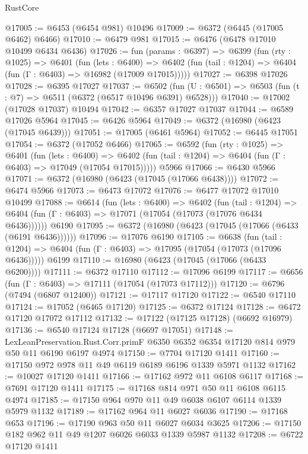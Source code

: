 \begin{lexlean}{RustCore}
\begin{coremodule}
@17005 := @6453 (@6454 @981) @10496
@17009 := @6372 (@6445 (@17005 @6462) @6466)
@17010 := @6479 @981
@17015 := @6476 (@6478 @17010 @10499 @6434 @6436)
@17026 := fun (params : @6397) =>
  @6399
    (fun (rty : @1025) =>
    @6401
      (fun (lets : @6400) =>
      @6402 (fun (tail : @1204) => @6404 (fun (Γ : @6403) => @16982 (@17009 @17015)))))
@17027 := @6398 @17026
@17028 := @6395 @17027
@17037 := @6502
    (fun (U : @6501) => @6503 (fun (t : @7) => @6511 (@6372 (@6517 @10496 @6391) @6528)))
@17040 := @17002 (@17028 @17037) @10494
@17042 := @6357 @17027 @17037
@17044 := @6589 @17026 @5964
@17045 := @6426 @5964
@17049 := @6372 (@16980 (@6423 (@17045 @6439)))
@17051 := @17005 (@6461 @5964)
@17052 := @6445 @17051
@17054 := @6372 (@17052 @6466)
@17065 := @6592
    (fun (rty : @1025) =>
    @6401
      (fun (lets : @6400) =>
      @6402 (fun (tail : @1204) => @6404 (fun (Γ : @6403) => @17049 (@17054 @17015)))))
    @5966
@17066 := @6430 @5966
@17071 := @6372 (@16980 (@6423 (@17045 (@17066 @6438))))
@17072 := @6474 @5966
@17073 := @6473 @17072
@17076 := @6477 @17072 @17010 @10499
@17088 := @6614
    (fun (lets : @6400) =>
    @6402
      (fun (tail : @1204) =>
      @6404 (fun (Γ : @6403) => @17071 (@17054 (@17073 (@17076 @6434 @6436))))))
    @6190
@17095 := @6372 (@16980 (@6423 (@17045 (@17066 (@6433 (@6191 @6436))))))
@17096 := @17076 @6190
@17105 := @6638
    (fun (tail : @1204) => @6404 (fun (Γ : @6403) => @17095 (@17054 (@17073 (@17096 @6436)))))
    @6199
@17110 := @16980 (@6423 (@17045 (@17066 (@6433 @6200))))
@17111 := @6372 @17110
@17112 := @17096 @6199
@17117 := @6656 (fun (Γ : @6403) => @17111 (@17054 (@17073 @17112)))
@17120 := @6796 (@7494 (@6807 @12400))
@17121 := @17117 @17120
@17122 := @6540 @17110
@17124 := @17052 (@6465 @17120)
@17125 := @6372 @17124
@17128 := @6472 @17120 @17072 @17112
@17132 := @17122 (@17125 @17128) (@6692 @16979)
@17136 := @6540 @17124 @17128 (@6697 @17051)
@17148 := LexLeanPreservation.Rust.Corr.primF
    @6350
    @6352
    @6354
    @17120
    @814
    @979
    @50
    @11
    @6190
    @6197
    @4974
@17150 := @7704 @17120 @1411
@17160 := @17150 @972 @978 @11 @49 @6119 @6189 @6196 @1339 @5971 @1132
@17162 := @10027 @17120 @1411
@17166 := @17162 @972 @11 @6108 @6117
@17168 := @7691 @17120 @1411
@17175 := @17168 @814 @971 @50 @11 @6108 @6115 @4974
@17185 := @17150 @964 @970 @11 @49 @6038 @6107 @6114 @1339 @5979 @1132
@17189 := @17162 @964 @11 @6027 @6036
@17190 := @17168 @653
@17196 := @17190 @963 @50 @11 @6027 @6034 @3625
@17206 := @17150 @182 @962 @11 @49 @1207 @6026 @6033 @1339 @5987 @1132
@17208 := @6722 @17120 @1411

\end{coremodule}
\end{lexlean}
